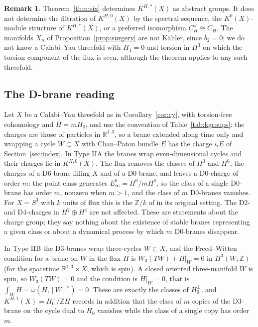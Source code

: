 \documentclass[reqno,11pt]{amsart}
\theoremstyle{definition}
\newtheorem{remark}[theorem]{Remark}
\newcommand{\ZZ}{\mathbb{Z}}
\newcommand{\RR}{\mathbb{R}}
\begin{document}
\begin{remark}\label{rem:torsion}
Theorem~\ref{thm:six} determines $K^{H,*}(X)$ as abstract groups. It does not determine the filtration of $K^{H,0}(X)$ by the spectral sequence, the $K^0(X)$-module structure of $K^{H,*}(X)$, or a preferred isomorphism $C_H^\vee\cong C_H$. The manifolds $X_n$ of Proposition~\ref{prop:surgery} are not K\"ahler, since $b_2=0$; we do not know a Calabi--Yau threefold with $H_1=0$ and torsion in $H^3$ on which the torsion component of the flux is seen, although the theorem applies to any such threefold.
\end{remark}

\subsection{The D-brane reading}\label{ssec:branes}
Let $X$ be a Calabi--Yau threefold as in Corollary~\ref{cor:cy}, with torsion-free cohomology and $H=mH_0$, and use the convention of Table~\ref{tab:kgroups}: the charges are those of particles in $\RR^{1,3}$, so a brane extended along time only and wrapping a cycle $W\subset X$ with Chan--Paton bundle $E$ has the charge $\iota_!E$ of Section~\ref{sec:index}. In Type IIA the branes wrap even-dimensional cycles and their charges lie in $K^{H,0}(X)$. The flux removes the classes of $H^0$ and $H^6$, the charges of a D6-brane filling $X$ and of a D0-brane, and leaves a D0-charge of order $m$: the point class generates $E_\infty^6=H^6/mH^6$, so the class of a single D0-brane has order $m$, nonzero when $m>1$, and the class of $m$ D0-branes vanishes. For $X=S^3$ with $k$ units of flux this is the $\ZZ/k$ of \cite{MMS01} in its original setting. The D2- and D4-charges in $H^2\oplus H^4$ are not affected. These are statements about the charge group; they say nothing about the existence of stable branes representing a given class or about a dynamical process by which $m$ D0-branes disappear.

In Type IIB the D3-branes wrap three-cycles $W\subset X$, and the Freed--Witten condition \cite{FW99} for a brane on $W$ in the flux $H$ is $W_3(TW)+H|_W=0$ in $H^3(W;\ZZ)$ (for the spacetime $\RR^{1,3}\times X$, which is spin). A closed oriented three-manifold $W$ is spin, so $W_3(TW)=0$ and the condition is $H|_W=0$, that is $\int_WH=\omega(H,[W]^\vee)=0$. These are exactly the classes of $H_0^\perp$, and $K^{H,1}(X)=H_0^\perp/\ZZ H$ records in addition that the class of $m$ copies of the D3-brane on the cycle dual to $H_0$ vanishes while the class of a single copy has order $m$.
\end{document}
